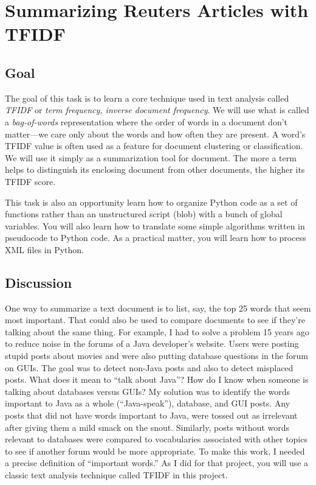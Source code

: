 \chapter{Summarizing Reuters Articles with TFIDF}

\section{Goal}

\begin{fullwidth}

The goal of this task is to learn a core technique used in text analysis called {\em TFIDF} or {\em term frequency, inverse document frequency}.  We will use what is called a {\em bag-of-words} representation where the order of words in a document don't matter---we care only about the words and how often they are present. A word's TFIDF value is often used as a feature for document clustering or classification. We will use it simply as a summarization tool for document. The more a term helps to distinguish its enclosing document from other documents, the higher its TFIDF score.

This task is also an opportunity learn how to organize Python code as a set of functions rather than an unstructured script (blob) with a bunch of global variables. You will also learn how to translate some simple algorithms written in pseudocode to Python code. As a practical matter, you will learn how to process XML files in Python.

\section{Discussion}

One way to summarize a text document is to list, say, the top 25 words that seem most important. That could also be used to compare documents to see if they're talking about the same thing. For example, I had to solve a problem 15 years ago to reduce noise in the forums of a Java developer's website.  Users were posting stupid posts about movies and were also putting database questions in the forum on GUIs. The goal was to detect non-Java posts and also to detect misplaced posts. What does it mean to ``talk about Java''?  How do I know when someone is talking about databases versus GUIs? My solution was to identify the words important to Java as a whole (``Java-speak''), database, and GUI posts.  Any posts that did not have words important to Java, were tossed out as irrelevant after giving them a mild smack on the snout. Similarly, posts without words relevant to databases were compared to vocabularies associated with other topics to see if another forum would be more appropriate. To make this work, I needed a precise definition of ``important words.'' As I did for that project, you will use a classic   text analysis technique called TFIDF in this project.


\end{fullwidth}
